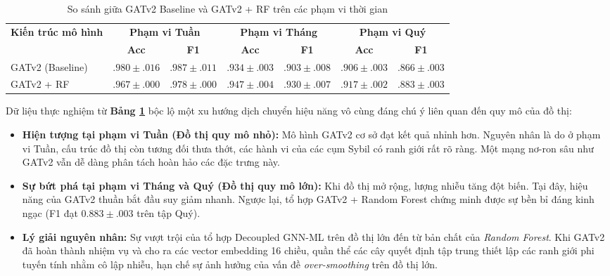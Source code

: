 \begin{table}[H]
    \centering
    \renewcommand{\arraystretch}{1.2}
    \setlength{\tabcolsep}{3pt}
    \caption{So sánh giữa GATv2 Baseline và GATv2 + RF trên các phạm vi thời gian}
    \label{tab:HeadToHead}
    \begin{tabular}{lcccccc}
        \hline
        \multirow{2}{*}{\textbf{Kiến trúc mô hình}} & \multicolumn{2}{c}{\textbf{Phạm vi Tuần}} & \multicolumn{2}{c}{\textbf{Phạm vi Tháng}} & \multicolumn{2}{c}{\textbf{Phạm vi Quý}} \\ \cline{2-7} 
        & \textbf{Acc} & \textbf{F1} & \textbf{Acc} & \textbf{F1} & \textbf{Acc} & \textbf{F1} \\ 
        \hline
        GATv2 (Baseline) & $\mathbf{.980 \pm .016}$ & $\mathbf{.987 \pm .011}$ & $.934 \pm .003$ & $.903 \pm .008$ & $.906 \pm .003$ & $.866 \pm .003$ \\
        GATv2 + RF & $.967 \pm .000$ & $.978 \pm .000$ & $\mathbf{.947 \pm .004}$ & $\mathbf{.930 \pm .007}$ & $\mathbf{.917 \pm .002}$ & $\mathbf{.883 \pm .003}$ \\
        \hline
    \end{tabular}
\end{table}

Dữ liệu thực nghiệm từ \textbf{Bảng \ref{tab:HeadToHead}} bộc lộ một xu hướng dịch chuyển hiệu năng vô cùng đáng chú ý liên quan đến quy mô của đồ thị:

\begin{itemize}[label={--}, itemsep=1pt]
    \item \textbf{Hiện tượng tại phạm vi Tuần (Đồ thị quy mô nhỏ):} Mô hình GATv2 cơ sở đạt kết quả nhỉnh hơn. Nguyên nhân là do ở phạm vi Tuần, cấu trúc đồ thị còn tương đối thưa thớt, các hành vi của các cụm Sybil có ranh giới rất rõ ràng. Một mạng nơ-ron sâu như GATv2 vẫn dễ dàng phân tách hoàn hảo các đặc trưng này.
    \item \textbf{Sự bứt phá tại phạm vi Tháng và Quý (Đồ thị quy mô lớn):} Khi đồ thị mở rộng, lượng nhiễu tăng đột biến. Tại đây, hiệu năng của GATv2 thuần bắt đầu suy giảm nhanh. Ngược lại, tổ hợp GATv2 + Random Forest chứng minh được sự bền bỉ đáng kinh ngạc (F1 đạt $0.883 \pm .003$ trên tập Quý). 
    \item \textbf{Lý giải nguyên nhân:} Sự vượt trội của tổ hợp Decoupled GNN-ML trên đồ thị lớn đến từ bản chất của \textit{Random Forest}. Khi GATv2 đã hoàn thành nhiệm vụ và cho ra các vector embedding 16 chiều, quần thể các cây quyết định tập trung thiết lập các ranh giới phi tuyến tính nhằm cô lập nhiễu, hạn chế sự ảnh hưởng của vấn đề \textit{over-smoothing} trên đồ thị lớn.
\end{itemize}

